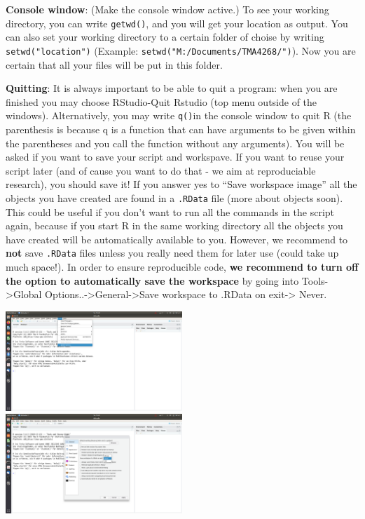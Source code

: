 \documentclass[]{article}
\begin{document}
\textbf{Console window}: (Make the console window active.) To see your
working directory, you can write \texttt{getwd()}, and you will get your
location as output. You can also set your working directory to a certain
folder of choise by writing \texttt{setwd("location")} (Example:
\texttt{setwd("M:/Documents/TMA4268/")}). Now you are certain that all
your files will be put in this folder.

\textbf{Quitting}: It is always important to be able to quit a program:
when you are finished you may choose RStudio-Quit Rstudio (top menu
outside of the windows). Alternatively, you may write \texttt{q()}in the
console window to quit R (the parenthesis is because q is a function
that can have arguments to be given within the parentheses and you call
the function without any arguments). You will be asked if you want to
save your script and workspave. If you want to reuse your script later
(and of cause you want to do that - we aim at reproduciable research),
you should save it! If you answer yes to ``Save workspace image'' all
the objects you have created are found in a \texttt{.RData} file (more
about objects soon). This could be useful if you don't want to run all
the commands in the script again, because if you start R in the same
working directory all the objects you have created will be automatically
available to you. However, we recommend to \textbf{not} save
\texttt{.RData} files unless you really need them for later use (could
take up much space!). In order to ensure reproducible code, \textbf{we
recommend to turn off the option to automatically save the workspace} by
going into Tools-\textgreater{}Global
Options..-\textgreater{}General-\textgreater{}Save workspace to .RData
on exit-\textgreater{} Never.

\includegraphics[width=0.50000\textwidth]{GlobalOptions.png}
\includegraphics[width=0.50000\textwidth]{GlobalOptions2.png}
\end{document}
